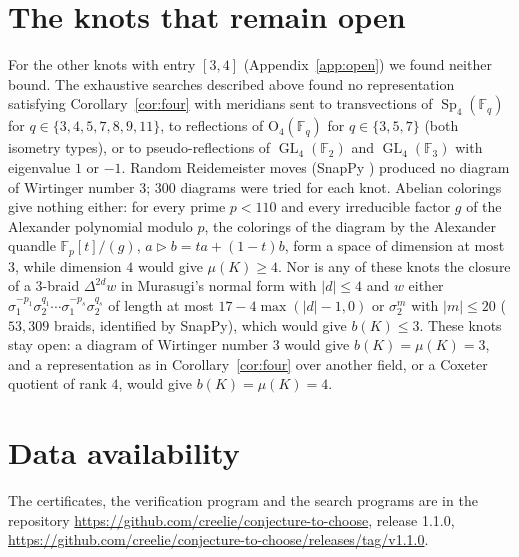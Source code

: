 \documentclass[11pt]{amsart}
\theoremstyle{definition}
\theoremstyle{remark}
\newcommand{\F}{\mathbb{F}}
\DeclareMathOperator{\Sp}{Sp}
\DeclareMathOperator{\GL}{GL}
\renewcommand{\O}{\mathrm{O}}
\begin{document}
\section{The knots that remain open}

For the other \nopen{} knots with entry $[3,4]$ (Appendix~\ref{app:open}) we found
neither bound. The exhaustive searches described above found no representation satisfying
Corollary~\ref{cor:four} with meridians sent to transvections of $\Sp_4(\F_q)$ for
$q\in\{3,4,5,7,8,9,11\}$, to reflections of $\O_4(\F_q)$ for $q\in\{3,5,7\}$ (both
isometry types), or to pseudo-reflections of $\GL_4(\F_2)$ and $\GL_4(\F_3)$ with
eigenvalue $1$ or $-1$. Random Reidemeister moves
(SnapPy \cite{SnapPy}) produced no diagram of Wirtinger number $3$; 300 diagrams were tried
for each knot. Abelian colorings give nothing either: for every prime $p<110$ and every
irreducible factor $g$ of the Alexander polynomial modulo $p$, the colorings of the
diagram by the Alexander quandle $\F_p[t]/(g)$, $a\triangleright b=ta+(1-t)b$, form a
space of dimension at most $3$, while dimension $4$ would give $\mu(K)\ge4$. Nor is any of
these knots the closure of a $3$-braid $\Delta^{2d}w$ in Murasugi's normal form with $|d|\le4$ and $w$ either
$\sigma_1^{-p_1}\sigma_2^{q_1}\cdots\sigma_1^{-p_s}\sigma_2^{q_s}$ of length at most
$17-4\max(|d|-1,0)$ or $\sigma_2^m$ with $|m|\le20$ ($53{,}309$ braids, identified by SnapPy), which would give $b(K)\le3$. These knots stay open: a diagram of Wirtinger number $3$ would give
$b(K)=\mu(K)=3$, and a representation as in Corollary~\ref{cor:four} over another field,
or a Coxeter quotient of rank $4$, would give $b(K)=\mu(K)=4$.

\section*{Data availability}
The certificates, the verification program and the search programs are in the repository
\url{https://github.com/creelie/conjecture-to-choose}, release 1.1.0,
\url{https://github.com/creelie/conjecture-to-choose/releases/tag/v1.1.0}.
\end{document}

